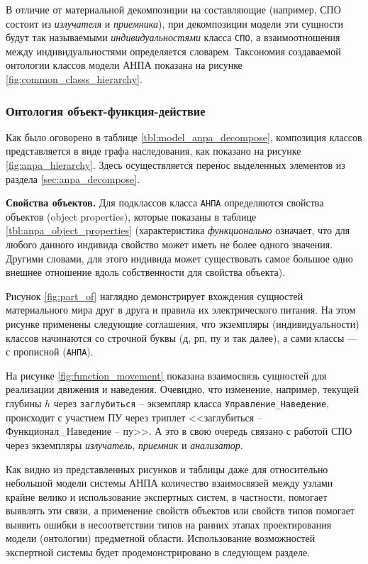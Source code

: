 В отличие от материальной декомпозиции на составляющие (например, СПО состоит из \textit{излучателя} и \textit{приемника}),
при декомпозиции модели эти сущности будут так называемыми \textit{индивидуальностями} класса \texttt{СПО},
а взаимоотношения между индивидуальностями определяется словарем.
Таксономия создаваемой онтологии классов модели АНПА показана на рисунке \ref{fig:common_classs_hierarchy}.

\subsubsection{Онтология объект-функция-действие}
Как было оговорено в таблице \ref{tbl:model_anpa_decompose}, композиция классов представляется в виде графа наследования,
как показано на рисунке \ref{fig:anpa_hierarchy}. Здесь осуществляется перенос выделенных элементов из раздела \ref{sec:anpa_decompose}.

\textbf{Свойства объектов.}
Для подклассов класса \texttt{АНПА} определяются свойства объектов (object properties), которые показаны в таблице \ref{tbl:anpa_object_properties}
(характеристика \textit{функционально} означает, что для любого данного индивида свойство может иметь не более одного значения. 
Другими словами, для этого индивида может существовать самое большое одно внешнее отношение вдоль собственности для свойства объекта).
%

Рисунок \ref{fig:part_of} наглядно демонстрирует вхождения сущностей материального мира друг в друга и правила их электрического питания.
На этом рисунке применены следующие соглашения, что экземпляры (индивидуальности) классов начинаются со строчной буквы (д, рп, пу и так далее),
а сами классы --- с прописной (\texttt{АНПА}).

На рисунке \ref{fig:function_movement} показана взаимосвязь сущностей для реализации движения и наведения.
Очевидно, что изменение, например, текущей глубины $h$ через \texttt{заглубиться} -- экземпляр класса \texttt{Управление\_Наведение},
происходит с участием ПУ через триплет <<заглубиться -- Функционал\_Наведение -- пу>>.
А это в свою очередь связано с работой СПО через экземпляры \textit{излучатель}, \textit{приемник} и \textit{анализатор}.

Как видно из представленных рисунков и таблицы даже для относительно небольшой модели системы АНПА количество взаимосвязей между узлами
крайне велико и использование экспертных систем, в частности, \protege помогает выявлять эти связи,
а применение свойств объектов или свойств типов помогает выявить ошибки в несоответствии типов на ранних этапах проектирования модели (онтологии)
предметной области. Использование возможностей экспертной системы будет продемонстрировано в следующем разделе.


